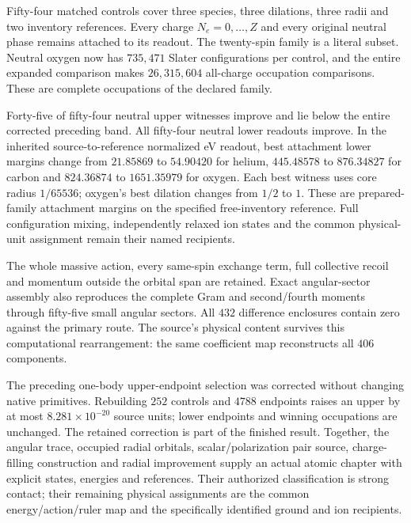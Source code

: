 Fifty-four matched controls cover three species, three dilations, three radii and two inventory references. Every charge $N_e=0,\ldots,Z$ and every original neutral phase remains attached to its readout. The twenty-spin family is a literal subset. Neutral oxygen now has $735{,}471$ Slater configurations per control, and the entire expanded comparison makes $26{,}315{,}604$ all-charge occupation comparisons. These are complete occupations of the declared family.

Forty-five of fifty-four neutral upper witnesses improve and lie below the entire corrected preceding band. All fifty-four neutral lower readouts improve. In the inherited source-to-reference normalized eV readout, best attachment lower margins change from $21.85869$ to $54.90420$ for helium, $445.48578$ to $876.34827$ for carbon and $824.36874$ to $1651.35979$ for oxygen. Each best witness uses core radius $1/65536$; oxygen's best dilation changes from $1/2$ to $1$. These are prepared-family attachment margins on the specified free-inventory reference. Full configuration mixing, independently relaxed ion states and the common physical-unit assignment remain their named recipients.

The whole massive action, every same-spin exchange term, full collective recoil and momentum outside the orbital span are retained. Exact angular-sector assembly also reproduces the complete Gram and second/fourth moments through fifty-five small angular sectors. All $432$ difference enclosures contain zero against the primary route. The source's physical content survives this computational rearrangement: the same coefficient map reconstructs all $406$ components.

The preceding one-body upper-endpoint selection was corrected without changing native primitives. Rebuilding $252$ controls and $4788$ endpoints raises an upper by at most $8.281\times10^{-20}$ source units; lower endpoints and winning occupations are unchanged. The retained correction is part of the finished result. Together, the angular trace, occupied radial orbitals, scalar/polarization pair source, charge-filling construction and radial improvement supply an actual atomic chapter with explicit states, energies and references. Their authorized classification is strong contact; their remaining physical assignments are the common energy/action/ruler map and the specifically identified ground and ion recipients.
